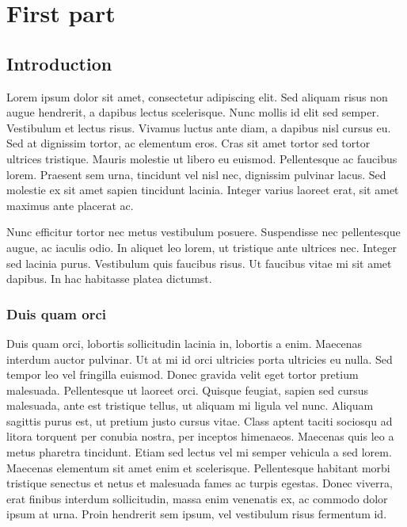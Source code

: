 \documentclass[a4paper,10pt]{book}
\begin{document}
\part{First part}

\chapter{Introduction}

Lorem ipsum dolor sit amet, consectetur adipiscing elit. Sed aliquam risus non augue hendrerit, a dapibus lectus
scelerisque. Nunc mollis id elit sed semper. Vestibulum et lectus risus. Vivamus luctus ante diam, a dapibus nisl
cursus eu. Sed at dignissim tortor, ac elementum eros. Cras sit amet tortor sed tortor ultrices tristique.
Mauris molestie ut libero eu euismod. Pellentesque ac faucibus lorem. Praesent sem urna, tincidunt vel nisl nec,
dignissim pulvinar lacus. Sed molestie ex sit amet sapien tincidunt lacinia. Integer varius laoreet erat, sit
amet maximus ante placerat ac.

Nunc efficitur tortor nec metus vestibulum posuere. Suspendisse nec pellentesque augue, ac iaculis odio.
In aliquet leo lorem, ut tristique ante ultrices nec. Integer sed lacinia purus. Vestibulum quis faucibus risus.
Ut faucibus vitae mi sit amet dapibus. In hac habitasse platea dictumst.

\section{Duis quam orci}

Duis quam orci, lobortis sollicitudin lacinia in, lobortis a enim. Maecenas interdum auctor pulvinar.
Ut at mi id orci ultricies porta ultricies eu nulla. Sed tempor leo vel fringilla euismod. Donec gravida velit
eget tortor pretium malesuada. Pellentesque ut laoreet orci. Quisque feugiat, sapien sed cursus malesuada,
ante est tristique tellus, ut aliquam mi ligula vel nunc. Aliquam sagittis purus est, ut pretium justo cursus vitae.
Class aptent taciti sociosqu ad litora torquent per conubia nostra, per inceptos himenaeos.
Maecenas quis leo a metus pharetra tincidunt. Etiam sed lectus vel mi semper vehicula a sed lorem.
Maecenas elementum sit amet enim et scelerisque.
Pellentesque habitant morbi tristique senectus et netus et malesuada fames ac turpis egestas.
Donec viverra, erat finibus interdum sollicitudin, massa enim venenatis ex, ac commodo dolor ipsum at urna.
Proin hendrerit sem ipsum, vel vestibulum risus fermentum id.
\end{document}
